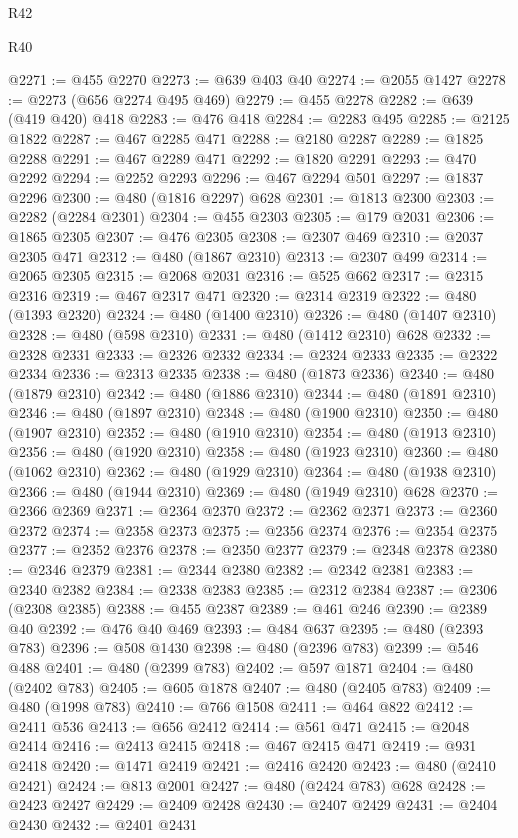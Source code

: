 \begin{lexlean}{R42}
\begin{lexlean}{R40}
\begin{coremodule}
{{{{{{{{{{{{{{{{{{{{{{{{{{{{{{{{{{{{{{{{{{{{{{{{{{{{{{{{{{{{{{{{{{{{{{{{{{{{{{{{{{{{{{{{{{{{{{{{{{{{{{{{{{{{{@2271 := @455 @2270
@2273 := @639 @403 @40
@2274 := @2055 @1427
@2278 := @2273 (@656 @2274 @495 @469)
@2279 := @455 @2278
@2282 := @639 (@419 @420) @418
@2283 := @476 @418
@2284 := @2283 @495
@2285 := @2125 @1822
@2287 := @467 @2285 @471
@2288 := @2180 @2287
@2289 := @1825 @2288
@2291 := @467 @2289 @471
@2292 := @1820 @2291
@2293 := @470 @2292
@2294 := @2252 @2293
@2296 := @467 @2294 @501
@2297 := @1837 @2296
@2300 := @480 (@1816 @2297) @628
@2301 := @1813 @2300
@2303 := @2282 (@2284 @2301)
@2304 := @455 @2303
@2305 := @179 @2031
@2306 := @1865 @2305
@2307 := @476 @2305
@2308 := @2307 @469
@2310 := @2037 @2305 @471
@2312 := @480 (@1867 @2310)
@2313 := @2307 @499
@2314 := @2065 @2305
@2315 := @2068 @2031
@2316 := @525 @662
@2317 := @2315 @2316
@2319 := @467 @2317 @471
@2320 := @2314 @2319
@2322 := @480 (@1393 @2320)
@2324 := @480 (@1400 @2310)
@2326 := @480 (@1407 @2310)
@2328 := @480 (@598 @2310)
@2331 := @480 (@1412 @2310) @628
@2332 := @2328 @2331
@2333 := @2326 @2332
@2334 := @2324 @2333
@2335 := @2322 @2334
@2336 := @2313 @2335
@2338 := @480 (@1873 @2336)
@2340 := @480 (@1879 @2310)
@2342 := @480 (@1886 @2310)
@2344 := @480 (@1891 @2310)
@2346 := @480 (@1897 @2310)
@2348 := @480 (@1900 @2310)
@2350 := @480 (@1907 @2310)
@2352 := @480 (@1910 @2310)
@2354 := @480 (@1913 @2310)
@2356 := @480 (@1920 @2310)
@2358 := @480 (@1923 @2310)
@2360 := @480 (@1062 @2310)
@2362 := @480 (@1929 @2310)
@2364 := @480 (@1938 @2310)
@2366 := @480 (@1944 @2310)
@2369 := @480 (@1949 @2310) @628
@2370 := @2366 @2369
@2371 := @2364 @2370
@2372 := @2362 @2371
@2373 := @2360 @2372
@2374 := @2358 @2373
@2375 := @2356 @2374
@2376 := @2354 @2375
@2377 := @2352 @2376
@2378 := @2350 @2377
@2379 := @2348 @2378
@2380 := @2346 @2379
@2381 := @2344 @2380
@2382 := @2342 @2381
@2383 := @2340 @2382
@2384 := @2338 @2383
@2385 := @2312 @2384
@2387 := @2306 (@2308 @2385)
@2388 := @455 @2387
@2389 := @461 @246
@2390 := @2389 @40
@2392 := @476 @40 @469
@2393 := @484 @637
@2395 := @480 (@2393 @783)
@2396 := @508 @1430
@2398 := @480 (@2396 @783)
@2399 := @546 @488
@2401 := @480 (@2399 @783)
@2402 := @597 @1871
@2404 := @480 (@2402 @783)
@2405 := @605 @1878
@2407 := @480 (@2405 @783)
@2409 := @480 (@1998 @783)
@2410 := @766 @1508
@2411 := @464 @822
@2412 := @2411 @536
@2413 := @656 @2412
@2414 := @561 @471
@2415 := @2048 @2414
@2416 := @2413 @2415
@2418 := @467 @2415 @471
@2419 := @931 @2418
@2420 := @1471 @2419
@2421 := @2416 @2420
@2423 := @480 (@2410 @2421)
@2424 := @813 @2001
@2427 := @480 (@2424 @783) @628
@2428 := @2423 @2427
@2429 := @2409 @2428
@2430 := @2407 @2429
@2431 := @2404 @2430
@2432 := @2401 @2431
}}}}}}}}}}}}}}}}}}}}}}}}}}}}}}}}}}}}}}}}}}}}}}}}}}}}}}}}}}}}}}}}}}}}}}}}}}}}}}}}}}}}}}}}}}}}}}}}}}}}}}}}}}}}}
\end{coremodule}
\end{lexlean}
\end{lexlean}
